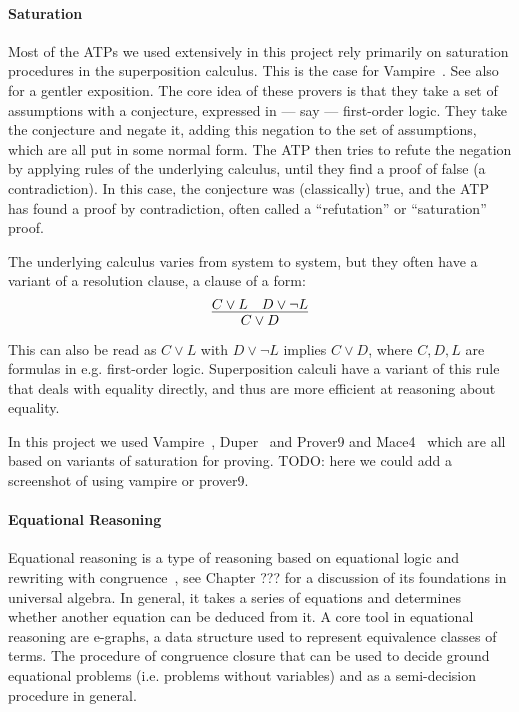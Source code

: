 \paragraph{Saturation}
Most of the ATPs we used extensively in this project rely primarily on saturation procedures in the superposition calculus.
This is the case for Vampire~\cite{DBLP:conf/cav/KovacsV13}.
See also~\cite{DBLP:journals/cacm/BentkampBNTVW23} for a gentler exposition.
The core idea of these provers is that they take a set of assumptions with a conjecture, expressed in --- say --- first-order logic.
They take the conjecture and negate it, adding this negation to the set of assumptions, which are all put in some normal form.
The ATP then tries to refute the negation by applying rules of the underlying calculus, until they find a proof of false (a contradiction).
In this case, the conjecture was (classically) true, and the ATP has found a proof by contradiction, often called a ``refutation'' or ``saturation'' proof.

The underlying calculus varies from system to system, but they often have a variant of a resolution clause, a clause of a form:
\[\infer{C \lor D}{C \lor L \quad D \lor \neg L} \]
This can also be read as $C \lor L$ with $D \lor \neg L$ implies $C \lor D$, where $C, D, L$ are formulas in e.g. first-order logic.
Superposition calculi have a variant of this rule that deals with equality directly, and thus are more efficient at reasoning about equality.

In this project we used Vampire~\cite{DBLP:conf/cav/KovacsV13}, Duper~\cite{DBLP:conf/itp/CluneQBA24} and Prover9 and Mace4~\cite{prover9-mace4} which are all based on variants of saturation for proving.
TODO: here we could add a screenshot of using vampire or prover9.

\paragraph{Equational Reasoning}

Equational reasoning is a type of reasoning based on equational logic and rewriting with congruence~\cite{term-rewriting}, see Chapter ??? for a discussion of its foundations in universal algebra.
In general, it takes a series of equations and determines whether another equation can be deduced from it.
A core tool in equational reasoning are e-graphs, a data structure used to represent equivalence classes of terms.
The procedure of congruence closure that can be used to decide ground equational problems (i.e. problems without variables) and as a semi-decision procedure in general.

